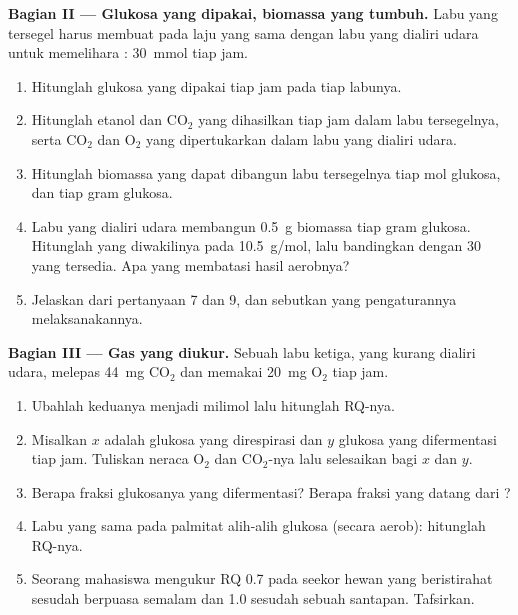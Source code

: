 \begin{problem}
\medskip
\noindent\textbf{Bagian II --- Glukosa yang dipakai, biomassa yang tumbuh.}
Labu yang tersegel harus membuat  pada laju yang sama dengan labu
yang dialiri udara untuk memelihara : \qty{30}{mmol}  tiap jam.
\begin{enumerate}[resume]
  \item Hitunglah glukosa yang dipakai tiap jam pada tiap labunya.
  \item Hitunglah etanol dan $\mathrm{CO_2}$ yang dihasilkan tiap jam
        dalam labu tersegelnya, serta $\mathrm{CO_2}$ dan
        $\mathrm{O_2}$ yang dipertukarkan dalam labu yang dialiri udara.
  \item Hitunglah biomassa yang dapat dibangun labu tersegelnya tiap
        mol glukosa, dan tiap gram glukosa.
  \item Labu yang dialiri udara membangun \qty{0.5}{g} biomassa tiap
        gram glukosa. Hitunglah  yang diwakilinya pada
        \qty{10.5}{g/mol}, lalu bandingkan dengan 30  yang tersedia.
        Apa yang membatasi hasil aerobnya?
  \item Jelaskan  dari pertanyaan 7 dan 9, dan sebutkan
         yang pengaturannya melaksanakannya.
\end{enumerate}

\medskip
\noindent\textbf{Bagian III --- Gas yang diukur.}
Sebuah labu ketiga, yang kurang dialiri udara, melepas \qty{44}{mg}
$\mathrm{CO_2}$ dan memakai \qty{20}{mg} $\mathrm{O_2}$ tiap jam.
\begin{enumerate}[resume]
  \item Ubahlah keduanya menjadi milimol lalu hitunglah RQ-nya.
  \item Misalkan $x$ adalah glukosa yang direspirasi dan $y$ glukosa
        yang difermentasi tiap jam. Tuliskan neraca $\mathrm{O_2}$ dan
        $\mathrm{CO_2}$-nya lalu selesaikan bagi $x$ dan $y$.
  \item Berapa fraksi glukosanya yang difermentasi? Berapa fraksi
         yang datang dari ?
  \item Labu yang sama pada palmitat alih-alih glukosa (secara aerob):
        hitunglah RQ-nya.
  \item Seorang mahasiswa mengukur RQ 0.7 pada seekor hewan yang
        beristirahat sesudah berpuasa semalam dan 1.0 sesudah sebuah
        santapan. Tafsirkan.
\end{enumerate}


\end{problem}
